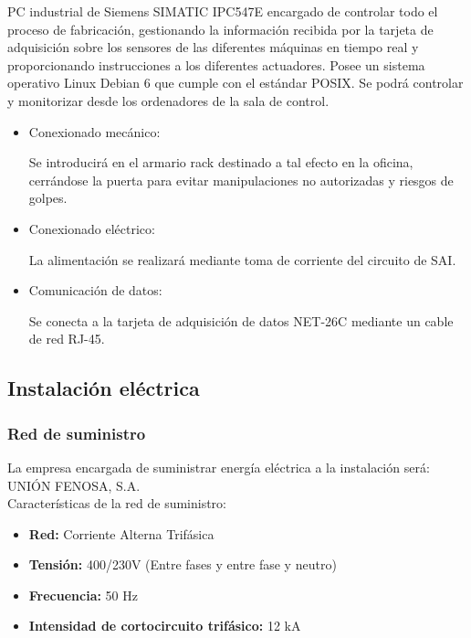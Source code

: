 	PC industrial de Siemens SIMATIC IPC547E encargado de controlar todo el proceso de fabricación, gestionando la información recibida por la tarjeta de adquisición sobre los sensores de las diferentes máquinas en tiempo real y proporcionando instrucciones a los diferentes actuadores. Posee un sistema operativo Linux Debian 6 que cumple con el estándar POSIX. Se podrá controlar y monitorizar desde los ordenadores de la sala de control.\\

		\begin{itemize}
				\item{Conexionado mecánico:}
				
				Se introducirá en el armario rack destinado a tal efecto en la oficina, cerrándose la puerta para evitar manipulaciones no autorizadas y riesgos de golpes.

				\item{Conexionado eléctrico:}
				
				La alimentación se realizará mediante toma de corriente del circuito de SAI.

				\item{Comunicación de datos:}
				
				Se conecta a la tarjeta de adquisición de datos NET-26C mediante un cable de red RJ-45.
		\end{itemize}

\newpage
	
\subsection{Instalación eléctrica}

\subsubsection{Red de suministro}

La empresa encargada de suministrar energía eléctrica a la instalación será:\\
UNIÓN FENOSA, S.A.\\

Características de la red de suministro:\

\begin{itemize}
\item {\bfseries Red:} Corriente Alterna Trifásica 
\item {\bfseries Tensión:} 400/230V (Entre fases y entre fase y neutro)
\item {\bfseries Frecuencia:} 50 Hz
\item {\bfseries Intensidad de cortocircuito trifásico:} 12 kA
\end{itemize}

